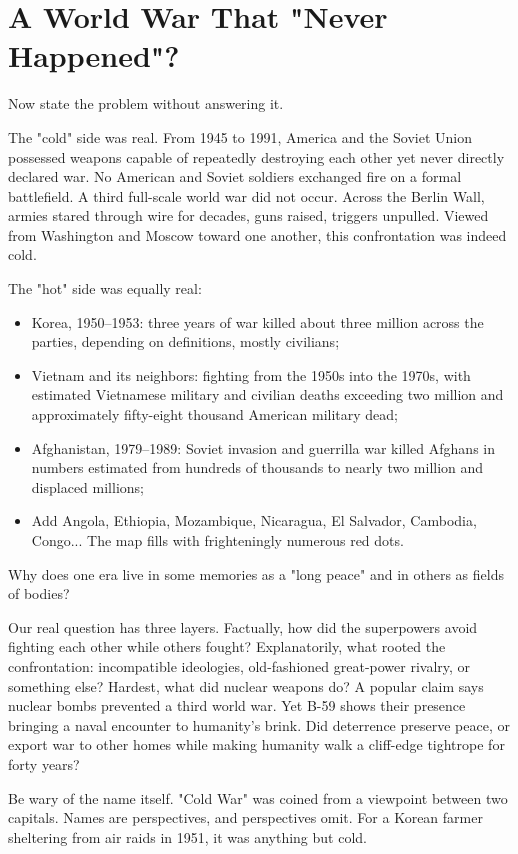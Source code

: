 \section{A World War That "Never Happened"?}
Now state the problem without answering it.

The "cold" side was real. From 1945 to 1991, America and the Soviet Union possessed weapons capable of repeatedly destroying each other yet never directly declared war. No American and Soviet soldiers exchanged fire on a formal battlefield. A third full-scale world war did not occur. Across the Berlin Wall, armies stared through wire for decades, guns raised, triggers unpulled. Viewed from Washington and Moscow toward one another, this confrontation was indeed cold.

The "hot" side was equally real:

\begin{itemize}
\item Korea, 1950--1953: three years of war killed about three million across the parties, depending on definitions, mostly civilians;
\item Vietnam and its neighbors: fighting from the 1950s into the 1970s, with estimated Vietnamese military and civilian deaths exceeding two million and approximately fifty-eight thousand American military dead;
\item Afghanistan, 1979--1989: Soviet invasion and guerrilla war killed Afghans in numbers estimated from hundreds of thousands to nearly two million and displaced millions;
\item Add Angola, Ethiopia, Mozambique, Nicaragua, El Salvador, Cambodia, Congo... The map fills with frighteningly numerous red dots.
\end{itemize}
Why does one era live in some memories as a "long peace" and in others as fields of bodies?

Our real question has three layers. Factually, how did the superpowers avoid fighting each other while others fought? Explanatorily, what rooted the confrontation: incompatible ideologies, old-fashioned great-power rivalry, or something else? Hardest, what did nuclear weapons do? A popular claim says nuclear bombs prevented a third world war. Yet B-59 shows their presence bringing a naval encounter to humanity's brink. Did deterrence preserve peace, or export war to other homes while making humanity walk a cliff-edge tightrope for forty years?

Be wary of the name itself. "Cold War" was coined from a viewpoint between two capitals. Names are perspectives, and perspectives omit. For a Korean farmer sheltering from air raids in 1951, it was anything but cold.

